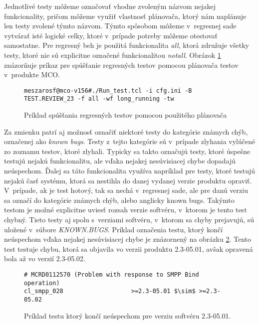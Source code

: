 Jednotlivé testy môžeme označovať vhodne zvoleným názvom nejakej 
funkcionality, pričom môžeme využiť vlastnosť plánovača, ktorý nám 
naplánuje len testy zvolené týmto názvom. Týmto spôsobom môžeme 
v~regresnej sade vytvárať isté logické celky, ktoré v~prípade potreby 
môžeme otestovať samostatne. Pre regresný beh je použitá funkcionalita 
\emph{all}, ktorá združuje všetky testy, ktoré nie sú explicitne označené 
funkcionalitou \emph{notall}. Obrázok \ref{obrazok:priklad_spustania_testov} 
znázorňuje príkaz pre spúšťanie regresných testov pomocou plánovača testov 
v~produkte MCO.

\begin{figure}[h]
\begin{lstlisting}
meszarosf@mco-v156#./Run_test.tcl -i cfg.ini -B TEST.REVIEW_23 -f all -wf long_running -tw
\end{lstlisting}
\caption{Príklad spúšťania regresných testov pomocou použitého plánovača}
\label{obrazok:priklad_spustania_testov}
\end{figure}

Za zmienku patrí aj možnosť označiť niektoré testy do kategórie 
známych chýb, označenej ako \emph{known bugs}. 
Testy z~tejto kategórie sú v~prípade zlyhania vylúčené zo zoznamu 
testov, ktoré zlyhali.
Typicky sa takto označujú testy, ktoré úspešne testujú nejakú 
funkcionalitu, ale vďaka nejakej nesúvisiacej chybe 
dopadajú neúspechom. Ďalej sa táto funkcionalita využíva napríklad pre 
testy, ktoré testujú nejakú časť systému, ktorá sa nestihla do danej 
vydanej verzie produktu opraviť. V~prípade, ak je test hotový, tak sa 
nechá v~regresnej sade, ale pre danú verziu sa označí do kategórie 
známych chýb, alebo anglicky known bugs.
Takýmto testom je možné explicitne uviesť rozsah verzie softvéru, 
v~ktorom je tento test chybný. Tieto testy aj spolu s~verziami softvéru, 
v~ktorom sa chyby prejavujú, sú uložené v~súbore \emph{KNOWN.BUGS}.
Príklad označenia testu, ktorý končí neúspechom vďaka nejakej 
nesúvisiacej chybe je znázornený na obrázku \ref{obrazok:known_bug}.
Tento test testuje chybu, ktorá sa objavila vo verzii produktu 2.3-05.01, 
avšak opravená bola až vo verzií 2.3-05.02. 

\begin{figure}[h]
\begin{lstlisting}[mathescape]
# MCRD0112570 (Problem with response to SMPP Bind operation)
cl_smpp_028                   >=2.3-05.01 $\sim$ >=2.3-05.02
\end{lstlisting}
\caption{Príklad testu ktorý končí neúspechom pre verziu softvéru 2.3-05.01.}
\label{obrazok:known_bug}
\end{figure}

